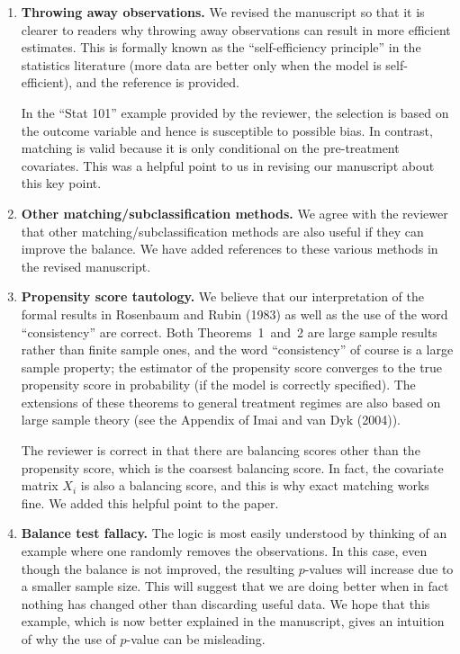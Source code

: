 \documentclass[11pt]{article}
\begin{document}
\begin{enumerate}
  
\item {\bf Throwing away observations.} We revised the manuscript so
  that it is clearer to readers why throwing away observations can
  result in more efficient estimates. This is formally known as the
  ``self-efficiency principle'' in the statistics literature (more
  data are better only when the model is self-efficient), and the
  reference is provided.
  
  In the ``Stat 101'' example provided by the reviewer, the selection
  is based on the outcome variable and hence is susceptible to
  possible bias. In contrast, matching is valid because it is only
  conditional on the pre-treatment covariates.  This was a helpful
  point to us in revising our manuscript about this key point.

\item {\bf Other matching/subclassification methods.} We agree with
  the reviewer that other matching/subclassification methods are also
  useful if they can improve the balance. We have added references to
  these various methods in the revised manuscript.
  
\item {\bf Propensity score tautology.} We believe that our
  interpretation of the formal results in Rosenbaum and Rubin (1983)
  as well as the use of the word ``consistency'' are correct. Both
  Theorems~1~and~2 are large sample results rather than finite sample
  ones, and the word ``consistency'' of course is a large sample
  property; the estimator of the propensity score converges to the
  true propensity score in probability (if the model is correctly
  specified).  The extensions of these theorems to general treatment
  regimes are also based on large sample theory (see the Appendix of
  Imai and van Dyk (2004)).
  
  The reviewer is correct in that there are balancing scores other
  than the propensity score, which is the coarsest balancing score. In
  fact, the covariate matrix $X_i$ is also a balancing score, and this
  is why exact matching works fine.  We added this helpful point to
  the paper.
  
\item {\bf Balance test fallacy.} The logic is most easily understood
  by thinking of an example where one randomly removes the
  observations. In this case, even though the balance is not improved,
  the resulting $p$-values will increase due to a smaller sample size.
  This will suggest that we are doing better when in fact nothing has
  changed other than discarding useful data.  We hope that this
  example, which is now better explained in the manuscript, gives an
  intuition of why the use of $p$-value can be misleading.

\end{enumerate}
\end{document}
